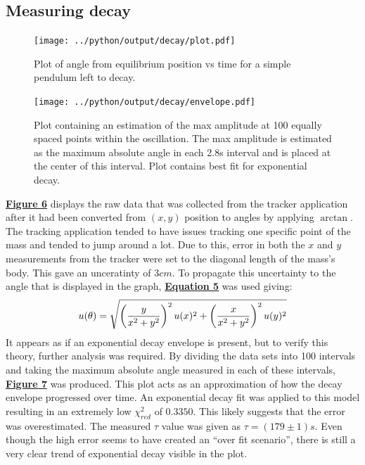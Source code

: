 \documentclass[
	letterpaper
	12pt
]{template}
\newcommand{\bref}[2]{\textbf{\hyperref[#1]{#2}}}
\begin{document}
\subsection{Measuring decay}
\begin{figure}[H]\label{decayPlots}
	\centering
	\begin{minipage}[t]{0.45\textwidth}
		\centering
		\texttt{[image: ../python/output/decay/plot.pdf]}
		\caption{Plot of angle from equilibrium position vs time for a simple pendulum left to decay.}
	\end{minipage}
	\hfill
	\begin{minipage}[t]{0.45\textwidth}
		\centering
		\texttt{[image: ../python/output/decay/envelope.pdf]}
		\caption{Plot containing an estimation of the max amplitude at 100 equally spaced points within the oscillation. The max amplitude is estimated as the maximum absolute angle in each 2.8s interval and is placed at the center of this interval. Plot contains best fit for exponential decay. }
	\end{minipage}
\end{figure}
\bref{decayPlots}{Figure 6} displays the raw data that was collected from the tracker application after it had been converted from $(x,y)$ position to angles by applying $\arctan$. The tracking application tended to have issues tracking one specific point of the mass and tended to jump around a lot. Due to this, error in both the $x$ and $y$ measurements from the tracker were set to the diagonal length of the mass's body. This gave an unceratinty of $3cm$. To propagate this uncertainty to the angle that is displayed in the graph, \bref{eqn::genUncert}{Equation 5} was used giving:
\[ u(\theta) = \sqrt{\left({y\over x^2 + y^2}\right)^2u(x)^2 + \left({x\over x^2 + y^2}\right)^2u(y)^2}\]
It appears as if an exponential decay envelope is present, but to verify this theory, further analysis was required. By dividing the data sets into 100 intervals and taking the maximum absolute angle measured in each of these intervals, \bref{decayPlots}{Figure 7} was produced. This plot acts as an approximation of how the decay envelope progressed over time. An exponential decay fit was applied to this model resulting in an extremely low $\chi_{red}^2$ of $0.3350$. This likely suggests that the error was overestimated. The measured $\tau$ value was given as $\tau = (179\pm1)\unit{s}$. Even though the high error seems to have created an ``over fit scenario'', there is still a very clear trend of exponential decay visible in the plot.
\end{document}
